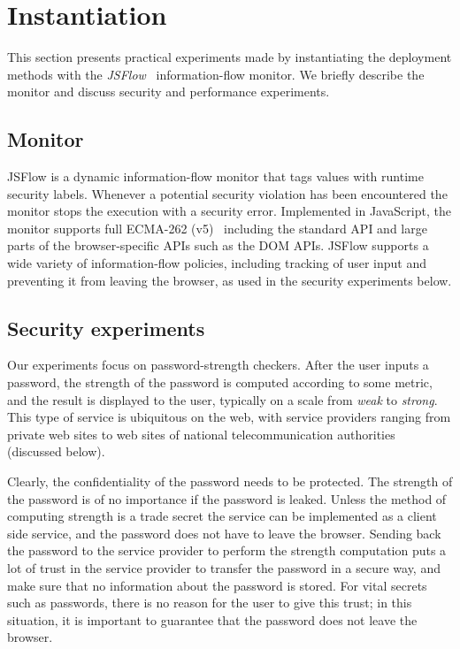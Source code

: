 \documentclass{llncs}
\begin{document}

\section{Instantiation}
\label{sec:case}

This section presents practical experiments made by instantiating the deployment
methods with the \emph{JSFlow}~\cite{Hedin:Sabelfeld:CSF12,JSFlow} information-flow monitor. 
We briefly describe the monitor and discuss security and performance experiments.

\subsection{Monitor}

JSFlow is a dynamic information-flow monitor that tags values with runtime
security labels. Whenever a potential security
violation has been encountered the monitor stops the execution with a security
error. Implemented in JavaScript, the monitor supports
full 
ECMA-262 (v5)~\cite{ecma:262:5} including the standard API and large parts of the
browser-specific APIs such as the DOM APIs. 
JSFlow supports a wide variety of information-flow policies,
including tracking of user input and preventing it from leaving the
browser, as used in
the security experiments below.

\subsection{Security experiments}
Our experiments focus on password-strength checkers. 
After the user inputs a password, the strength of the password is computed according
to some metric, and the result is displayed to the user, typically on a scale
from \emph{weak} to \emph{strong}. This type of service is ubiquitous
on the web, with service providers ranging from private web sites to web sites
of national telecommunication authorities (discussed below).

Clearly, the confidentiality of the password needs to be protected.
The strength of the password is of no importance if the password is leaked.
Unless the method of computing strength is a trade secret the service can be
implemented as a client side service, and the password does not have to leave the
browser. Sending back the password to the service provider to perform
the strength computation puts a lot of trust in the service provider to transfer the
password in a secure way, and make sure that no information about the password
is stored. For vital secrets such as passwords, there is no reason for the user
to give this trust; in this situation, it is important to guarantee that
the password does not leave the browser.
\end{document}
